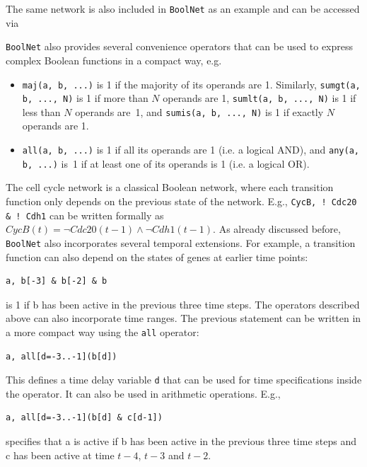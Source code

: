 \documentclass[a4paper]{article}
\begin{document}
The same network is also included in \texttt{BoolNet} as an example and can be accessed via
\begin{knitrout}
\color{fgcolor}\begin{kframe}
\begin{alltt}
\end{alltt}
\end{kframe}
\end{knitrout}

\texttt{BoolNet} also provides several convenience operators that can be used to express complex Boolean functions in a compact way, e.g.
\begin{itemize}
\item \texttt{maj(a, b, ...)} is 1 if the majority of its operands are 1. Similarly, \texttt{sumgt(a, b, ..., N)} is 1 if more than $N$ operands are 1, \texttt{sumlt(a, b, ..., N)} is 1 if less than $N$ operands are~1, and \texttt{sumis(a, b, ..., N)}  is 1 if exactly $N$ operands are 1.
\item \texttt{all(a, b, ...)} is 1 if all its operands are 1 (i.e. a logical AND), and \texttt{any(a, b, ...)} is~1 if at least one of its operands is 1 (i.e. a logical OR).
\end{itemize}

The cell cycle network is a classical Boolean network, where each transition function only depends on the previous state of the network. E.g., \verb+CycB, ! Cdc20 & ! Cdh1+ can be written formally as $CycB(t) = \neg Cdc20(t-1)  \wedge \neg Cdh1(t-1)$. As already discussed before, \texttt{BoolNet} also incorporates several temporal extensions. For example, a transition function can also depend on the states of genes at earlier time points:
\begin{verbatim}
a, b[-3] & b[-2] & b
\end{verbatim}
is 1 if b has been active in the previous three time steps. The operators described above can also incorporate time ranges. The previous statement can be written in a more compact way using the \texttt{all} operator:
\begin{verbatim}
a, all[d=-3..-1](b[d])
\end{verbatim}
This defines a time delay variable \texttt{d} that can be used for time specifications inside the operator. It can also be used in arithmetic operations. E.g.,
\begin{verbatim}
a, all[d=-3..-1](b[d] & c[d-1])
\end{verbatim}
specifies that a is active if b has been active in the previous three time steps and c has been active at time $t-4$, $t-3$ and $t-2$. 
\end{document}
